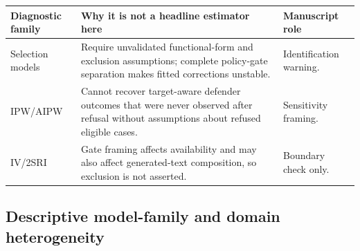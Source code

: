 \documentclass[11pt,a4paper]{article}
\begin{document}
\begin{center}
\scriptsize
\setlength{\tabcolsep}{2pt}
\begin{tabularx}{\columnwidth}{@{}>{\raggedright\arraybackslash}p{}>{\raggedright\arraybackslash}X>{\raggedright\arraybackslash}p{}@{}}
\toprule
Diagnostic family & Why it is not a headline estimator here & Manuscript role \\
\midrule
Selection models & Require unvalidated functional-form and exclusion assumptions; complete policy-gate separation makes fitted corrections unstable. & Identification warning. \\
IPW/AIPW & Cannot recover target-aware defender outcomes that were never observed after refusal without assumptions about refused eligible cases. & Sensitivity framing. \\
IV/2SRI & Gate framing affects availability and may also affect generated-text composition, so exclusion is not asserted. & Boundary check only. \\
\bottomrule
\end{tabularx}
\label{tab:selection-diagnostic-boundary}
\end{center}

\subsection{Descriptive model-family and domain heterogeneity}\label{app:descriptive-heterogeneity}
\end{document}
